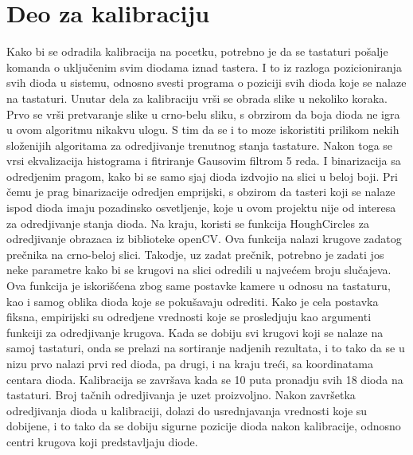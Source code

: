 \documentclass[a4paper,12pt, projekat]{etf}
\begin{document}
        \section{Deo za kalibraciju}
        Kako bi se odradila kalibracija na pocetku, potrebno je da se tastaturi
        po\v{s}alje komanda o uklju\v{c}enim svim diodama iznad tastera. I to iz
        razloga pozicioniranja svih dioda u sistemu, odnosno svesti programa o
        poziciji svih dioda koje se nalaze na tastaturi. Unutar dela za
        kalibraciju vr\v{s}i se obrada slike u nekoliko koraka. Prvo se vr\v{s}i
        pretvaranje slike u crno-belu sliku, s obrzirom da boja dioda ne igra u
        ovom algoritmu nikakvu ulogu. S tim da se i to moze iskoristiti
        prilikom nekih slo\v{z}enijih algoritama za odredjivanje trenutnog stanja
        tastature. Nakon toga se vrsi ekvalizacija histograma i fitriranje
        Gausovim filtrom 5 reda. I binarizacija sa odredjenim pragom, kako bi
        se samo sjaj dioda izdvojio na slici u beloj boji. Pri \v{c}emu je prag
        binarizacije odredjen emprijski, s obzirom da tasteri koji se nalaze
        ispod dioda imaju pozadinsko osvetljenje, koje u ovom projektu nije od
        interesa za odredjivanje stanja dioda. Na kraju, koristi se funkcija
        HoughCircles za odredjivanje obrazaca iz biblioteke openCV\@. Ova
        funkcija nalazi krugove zadatog pre\v{c}nika na crno-beloj slici. Takodje,
        uz zadat pre\v{c}nik, potrebno je zadati jos neke parametre kako bi se
        krugovi na slici odredili u najve\'{c}em broju slu\v{c}ajeva. Ova funkcija je
        iskori\v{s}\'{c}ena zbog same postavke kamere u odnosu na tastaturu, kao i
        samog oblika dioda koje se poku\v{s}avaju odrediti. Kako je cela postavka
        fiksna, empirijski su odredjene vrednosti koje se prosledjuju kao
        argumenti funkciji za odredjivanje krugova. Kada se dobiju svi krugovi
        koji se nalaze na samoj tastaturi, onda se prelazi na sortiranje
        nadjenih rezultata, i to tako da se u nizu prvo nalazi prvi red dioda,
        pa drugi, i na kraju tre\'{c}i, sa koordinatama centara dioda. Kalibracija
        se zavr\v{s}ava kada se 10 puta pronadju svih 18 dioda na tastaturi. Broj
        ta\v{c}nih odredjivanja je uzet proizvoljno. Nakon zavr\v{s}etka odredjivanja
        dioda u kalibraciji, dolazi do usrednjavanja vrednosti koje su
        dobijene, i to tako da se dobiju sigurne pozicije dioda nakon
        kalibracije, odnosno centri krugova koji predstavljaju diode.
\end{document}
